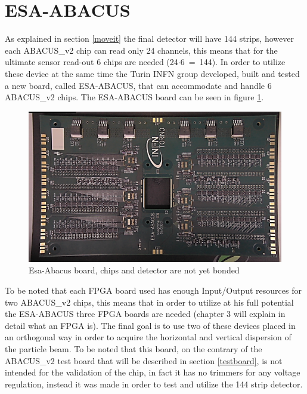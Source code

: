 \section{ESA-ABACUS}\label{esaabacus}
\noindent As explained in section \ref{moveit} the final detector will have 144 strips, however each ABACUS\_v2 chip can read only 24 channels, this means that for the ultimate sensor read-out 6 chips are needed (24$\cdot$6~=~144).
In order to utilize these device at the same time the Turin INFN group developed, built and tested a new board, called ESA-ABACUS, that can accommodate and handle 6 ABACUS\_v2 chips. The ESA-ABACUS board can be seen in figure \ref{fig:esaabacus}.
\begin{figure}[H]
	\centering
	\includegraphics[width=0.7\linewidth]{IMG/ch2/EsaAbacus.png}
	\caption{Esa-Abacus board, chips and detector are not yet bonded}
	\label{fig:esaabacus}
\end{figure}
\noindent To be noted that each FPGA board used has enough Input/Output resources for two ABACUS\_v2 chips, this means that in order to utilize at his full potential the ESA-ABACUS three FPGA boards are needed (chapter 3 will explain in detail what an FPGA is).
The final goal is to use two of these devices placed in an orthogonal way in order to acquire the horizontal and vertical dispersion of the particle beam.
To be noted that this board, on the contrary of the ABACUS\_v2 test board that will be described in section \ref{testboard}, is not intended for the validation of the chip, in fact it has no trimmers for any voltage regulation, instead it was made in order to test and utilize the 144 strip detector.



